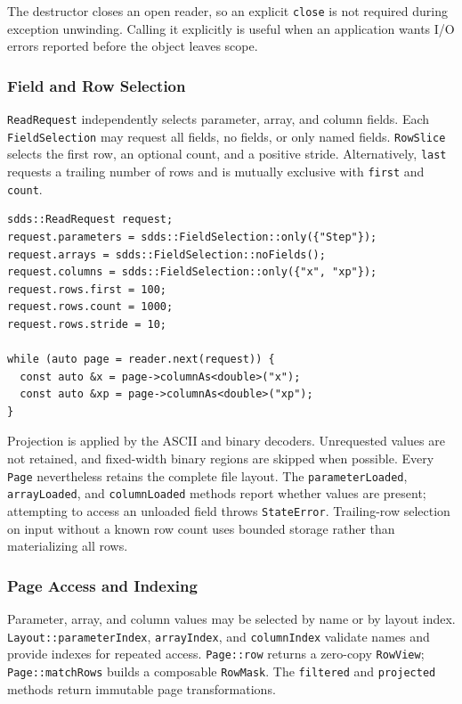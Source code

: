 \documentclass[11pt]{article}
\begin{document}
The destructor closes an open reader, so an explicit {\tt close} is not
required during exception unwinding.  Calling it explicitly is useful when an
application wants I/O errors reported before the object leaves scope.

\subsubsection{Field and Row Selection}

{\tt ReadRequest} independently selects parameter, array, and column fields.
Each {\tt FieldSelection} may request all fields, no fields, or only named
fields.  {\tt RowSlice} selects the first row, an optional count, and a positive
stride.  Alternatively, {\tt last} requests a trailing number of rows and is
mutually exclusive with {\tt first} and {\tt count}.

\begin{verbatim}
sdds::ReadRequest request;
request.parameters = sdds::FieldSelection::only({"Step"});
request.arrays = sdds::FieldSelection::noFields();
request.columns = sdds::FieldSelection::only({"x", "xp"});
request.rows.first = 100;
request.rows.count = 1000;
request.rows.stride = 10;

while (auto page = reader.next(request)) {
  const auto &x = page->columnAs<double>("x");
  const auto &xp = page->columnAs<double>("xp");
}
\end{verbatim}

Projection is applied by the ASCII and binary decoders.  Unrequested values are
not retained, and fixed-width binary regions are skipped when possible.  Every
{\tt Page} nevertheless retains the complete file layout.  The
{\tt parameterLoaded}, {\tt arrayLoaded}, and {\tt columnLoaded} methods report
whether values are present; attempting to access an unloaded field throws
{\tt StateError}.  Trailing-row selection on input without a known row count
uses bounded storage rather than materializing all rows.

\subsubsection{Page Access and Indexing}

Parameter, array, and column values may be selected by name or by layout index.
{\tt Layout::parameterIndex}, {\tt arrayIndex}, and {\tt columnIndex} validate
names and provide indexes for repeated access.  {\tt Page::row} returns a
zero-copy {\tt RowView}; {\tt Page::matchRows} builds a composable
{\tt RowMask}.  The {\tt filtered} and {\tt projected} methods return immutable
page transformations.
\end{document}
